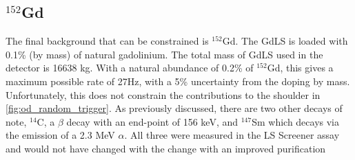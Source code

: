 






\subsection{${}^{152}$Gd}
\par
The final background that can be constrained is ${}^{152}$Gd.
The GdLS is loaded with 0.1\% (by mass) of natural gadolinium.
The total mass of GdLS used in the detector is 16638 kg.
With a natural abundance of 0.2\% of ${}^{152}$Gd, this gives a maximum possible rate of 27Hz, with a 5\% uncertainty from the doping by mass.
Unfortunately, this does not constrain the contributions to the shoulder in \autoref{fig:od_random_trigger}.
As previously discussed, there are two other decays of note, ${}^{14}$C, a $\beta$ decay with an end-point of 156 keV, and ${}^{147}$Sm which decays via the emission of a 2.3 MeV $\alpha$.
All three were measured in the LS Screener assay and would not have changed with the change with an improved purification \cite{scotthaselschwardt_thesis_ref}


